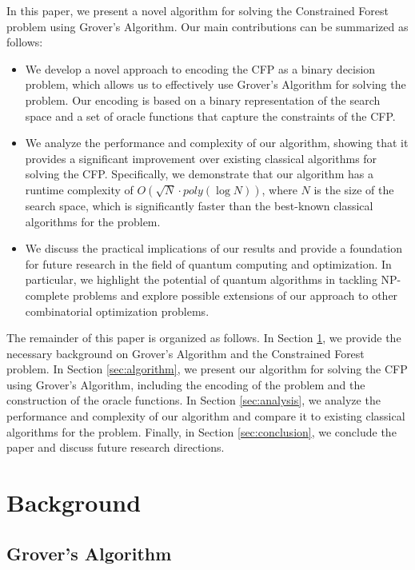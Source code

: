 In this paper, we present a novel algorithm for solving the Constrained Forest problem using Grover's Algorithm. Our main contributions can be summarized as follows:

\begin{itemize}
    \item We develop a novel approach to encoding the CFP as a binary decision problem, which allows us to effectively use Grover's Algorithm for solving the problem. Our encoding is based on a binary representation of the search space and a set of oracle functions that capture the constraints of the CFP.
    
    \item We analyze the performance and complexity of our algorithm, showing that it provides a significant improvement over existing classical algorithms for solving the CFP. Specifically, we demonstrate that our algorithm has a runtime complexity of $O(\sqrt{N} \cdot poly(\log N))$, where $N$ is the size of the search space, which is significantly faster than the best-known classical algorithms for the problem.
    
    \item We discuss the practical implications of our results and provide a foundation for future research in the field of quantum computing and optimization. In particular, we highlight the potential of quantum algorithms in tackling NP-complete problems and explore possible extensions of our approach to other combinatorial optimization problems.
\end{itemize}

The remainder of this paper is organized as follows. In Section \ref{sec:background}, we provide the necessary background on Grover's Algorithm and the Constrained Forest problem. In Section \ref{sec:algorithm}, we present our algorithm for solving the CFP using Grover's Algorithm, including the encoding of the problem and the construction of the oracle functions. In Section \ref{sec:analysis}, we analyze the performance and complexity of our algorithm and compare it to existing classical algorithms for the problem. Finally, in Section \ref{sec:conclusion}, we conclude the paper and discuss future research directions.

\section{Background}
\label{sec:background}

\subsection{Grover's Algorithm}

